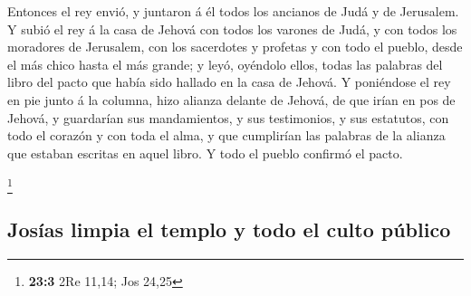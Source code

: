  Entonces el rey envió, y juntaron á él todos los ancianos
de Judá y de Jerusalem.  Y subió el rey á la casa de
Jehová con todos los varones de Judá, y con todos los moradores de
Jerusalem, con los sacerdotes y profetas y con todo el pueblo, desde el
más chico hasta el más grande; y leyó, oyéndolo ellos, todas las
palabras del libro del pacto que había sido hallado en la casa de
Jehová.  Y poniéndose el rey en pie junto á la columna,
hizo alianza delante de Jehová, de que irían en pos de Jehová, y
guardarían sus mandamientos, y sus testimonios, y sus estatutos, con
todo el corazón y con toda el alma, y que cumplirían las palabras de la
alianza que estaban escritas en aquel libro. Y todo el pueblo confirmó
el pacto.

\footnote{\textbf{23:3} 2Re 11,14; Jos 24,25}

\hypertarget{josuxedas-limpia-el-templo-y-todo-el-culto-puxfablico}{%
\subsection{Josías limpia el templo y todo el culto
público}\label{josuxedas-limpia-el-templo-y-todo-el-culto-puxfablico}}

